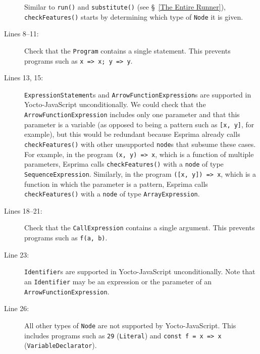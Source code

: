 \documentclass[12pt, oneside]{book}
\begin{document}
\begin{description}
Similar to \texttt{run()} and \texttt{substitute()} (see §~\ref{The Entire Runner}), \texttt{checkFeatures()} starts by determining which type of \texttt{Node} it is given.

\item [Lines 8–11:]

Check that the \texttt{Program} contains a single statement. This prevents programs such as \texttt{x => x; y => y}.

\item [Lines 13, 15:]

\texttt{ExpressionStatement}s and \texttt{ArrowFunctionExpression}s are supported in Yocto-JavaScript unconditionally. We could check that the \texttt{ArrowFunctionExpression} includes only one parameter and that this parameter is a variable (as opposed to being a pattern such as \texttt{[x, y]}, for example), but this would be redundant because Esprima already calls \texttt{checkFeatures()} with other unsupported \texttt{node}s that subsume these cases. For example, in the program \texttt{(x, y) => x}, which is a function of multiple parameters, Esprima calls \texttt{checkFeatures()} with a \texttt{node} of type \texttt{SequenceExpression}. Similarly, in the program \texttt{([x, y]) => x}, which is a function in which the parameter is a pattern, Esprima calls \texttt{checkFeatures()} with a \texttt{node} of type \texttt{ArrayExpression}.

\item [Lines 18–21:]

Check that the \texttt{CallExpression} contains a single argument. This prevents programs such as \texttt{f(a, b)}.

\item [Line 23:]

\texttt{Identifier}s are supported in Yocto-JavaScript unconditionally. Note that an \texttt{Identifier} may be an expression or the parameter of an \texttt{ArrowFunctionExpression}.

\item [Line 26:]

All other types of \texttt{Node} are not supported by Yocto-JavaScript. This includes programs such as \texttt{29} (\texttt{Literal}) and \texttt{const f = x => x} (\texttt{VariableDeclarator}).
\end{description}
\end{document}
